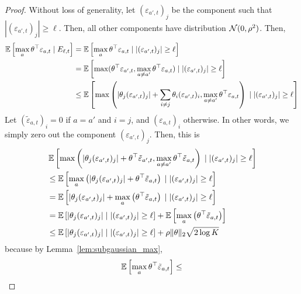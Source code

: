 \begin{proof}
  Without loss of generality, let $(\varepsilon_{a',t})_j$ be the component such
  that $|(\varepsilon_{a',t})_j| \ge \ell$. Then, all other components have
  distribution $\mathcal{N}(0, \rho^2)$. Then,
  \begin{align*}
    \operatorname{\mathbb{E}} \left[\max_a \theta^{\top} \varepsilon_{a,t} \;|\;
    E_{\ell, t}\right]
    &=\operatorname{\mathbb{E}} \left[\max_a \theta^{\top} \varepsilon_{a,t} \;|\;
    |(\varepsilon_{a',t})_j| \ge \ell\right] \\
    &=\operatorname{\mathbb{E}} \left[\max(\theta^{\top} \varepsilon_{a',t}, \max_{a
    \ne a'} \theta^{\top} \varepsilon_{a ,t}) \;|\; |(\varepsilon_{a',t})_j| \ge
    \ell\right] \\
    &\le\operatorname{\mathbb{E}} \left[\max\left(|\theta_j (\varepsilon_{a',t})_j| +
    \sum_{i \ne j} \theta_i (\varepsilon_{a',t})_i, \max_{a \ne a'} \theta^{\top}
    \varepsilon_{a ,t}\right) \;|\; |(\varepsilon_{a',t})_j| \ge \ell\right]
  \end{align*}
  Let $(\tilde \varepsilon_{a,t})_i = 0$ if $a = a'$ and $i = j$, and
  $(\varepsilon_{a,t})_i$ otherwise. In other words, we simply zero out the
  component $(\varepsilon_{a',t})_j$. Then, this is
  \begin{align*}
    &\operatorname{\mathbb{E}} \left[\max\left(|\theta_j (\varepsilon_{a',t})_j| +
    \theta^{\top} \tilde \varepsilon_{a',t}, \max_{a \ne a'} \theta^{\top}
    \tilde \varepsilon_{a ,t}\right) \;|\; |(\varepsilon_{a',t})_j| \ge \ell\right] \\
    &\le \operatorname{\mathbb{E}} \left[\max_a \left(|\theta_j
    (\varepsilon_{a',t})_j| + \theta^{\top} \tilde \varepsilon_{a,t}\right) \;|\;
    |(\varepsilon_{a',t})_j| \ge \ell\right] \\
    &= \operatorname{\mathbb{E}} \left[|\theta_j (\varepsilon_{a',t})_j| + \max_a
    \left(\theta^{\top} \tilde \varepsilon_{a,t}\right) \;|\; |(\varepsilon_{a',t})_j|
    \ge \ell\right] \\
    &= \operatorname{\mathbb{E}} \left[|\theta_j (\varepsilon_{a',t})_j|\;|\;
    |(\varepsilon_{a',t})_j| \ge \ell\right] + \operatorname{\mathbb{E}} \left[\max_{a}
    \left(\theta^{\top} \tilde \varepsilon_{a,t}\right)\right] \\
    &\le \operatorname{\mathbb{E}} \left[|\theta_j (\varepsilon_{a',t})_j|\;|\;
    |(\varepsilon_{a',t})_j| \ge \ell\right] + \rho \|\theta\|_2\sqrt{2\log K}
  \end{align*}
  because by Lemma~\ref{lem:subgaussian_max},
  \[
    \operatorname{\mathbb{E}} \left[\max_a \theta^{\top} \tilde \varepsilon_{a,t}\right] \le
\]
\end{proof}
